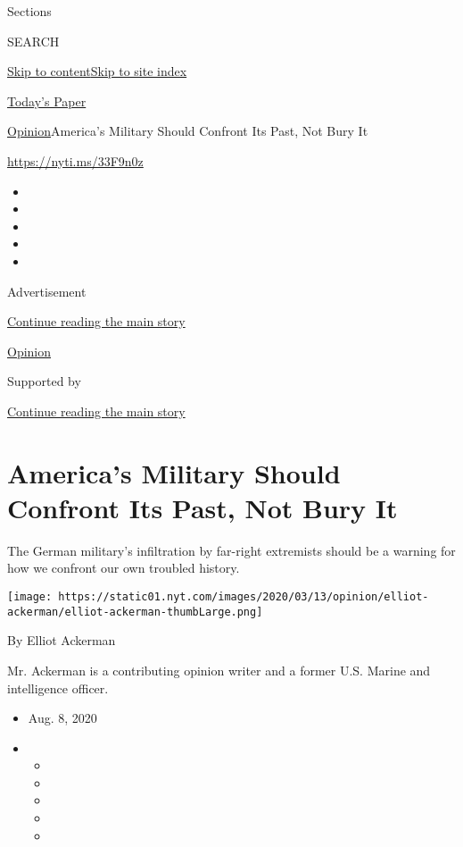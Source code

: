 Sections

SEARCH

\protect\hyperlink{site-content}{Skip to
content}\protect\hyperlink{site-index}{Skip to site index}

\href{https://myaccount.nytimes.com/auth/login?response_type=cookie\&client_id=vi}{}

\href{https://www.nytimes.com/section/todayspaper}{Today's Paper}

\href{/section/opinion}{Opinion}\textbar{}America's Military Should
Confront Its Past, Not Bury It

\href{https://nyti.ms/33F9n0z}{https://nyti.ms/33F9n0z}

\begin{itemize}
\item
\item
\item
\item
\item
\end{itemize}

Advertisement

\protect\hyperlink{after-top}{Continue reading the main story}

\href{/section/opinion}{Opinion}

Supported by

\protect\hyperlink{after-sponsor}{Continue reading the main story}

\hypertarget{americas-military-should-confront-its-past-not-bury-it}{%
\section{America's Military Should Confront Its Past, Not Bury
It}\label{americas-military-should-confront-its-past-not-bury-it}}

The German military's infiltration by far-right extremists should be a
warning for how we confront our own troubled history.

\texttt{[image: https://static01.nyt.com/images/2020/03/13/opinion/elliot-ackerman/elliot-ackerman-thumbLarge.png]}

By Elliot Ackerman

Mr. Ackerman is a contributing opinion writer and a former U.S. Marine
and intelligence officer.

\begin{itemize}
\item
  Aug. 8, 2020
\item
  \begin{itemize}
  \item
  \item
  \item
  \item
  \item
  \end{itemize}
\end{itemize}

